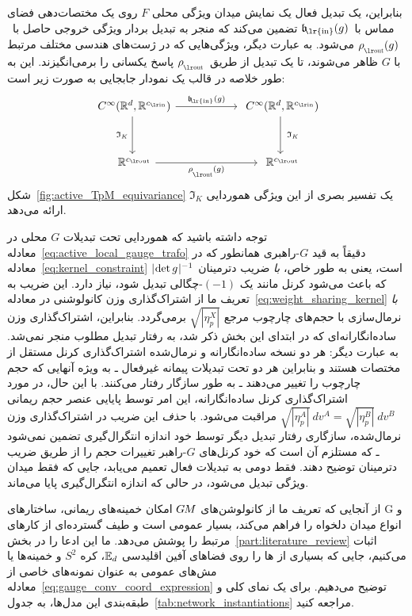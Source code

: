بنابراین، یک تبدیل فعال یک نمایش میدان ویژگی محلی $F$ روی یک مختصات‌دهی فضای مماس با~$\mathfrakb_{\mkern-5mu\textup{\lr{in}}}(g)$ تضمین می‌کند که منجر به تبدیل بردار ویژگی خروجی حاصل با~$\rhoout(g)$ می‌شود.
به عبارت دیگر، ویژگی‌هایی که در ژست‌های هندسی مختلف مرتبط با $G$ ظاهر می‌شوند، تا یک تبدیل از طریق~$\rhoout$ پاسخ یکسانی را برمی‌انگیزند.
این به طور خلاصه در قالب یک نمودار جابجایی به صورت زیر است:
\begin{equation}\label{cd:active_G_equivariance}
	\begin{tikzcd}[column sep=56pt, row sep=34pt, font=\normalsize]
		C^\infty(\R^d,\R^{\cin})
		\arrow[d, "\mathfrak{I}_K\,"']
		\arrow[r, "\mathfrakb_{\mkern-5mu\textup{\lr{in}}}(g)"]
		&
		C^\infty(\R^d,\R^{\cin})
		\arrow[d, "\ \mathfrak{I}_K"]
		\\
		\R^{\cout}
		\arrow[r, "\rhoout(g)"']
		&
		\R^{\cout}
	\end{tikzcd}
\end{equation}
شکل~\ref{fig:active_TpM_equivariance} یک تفسیر بصری از این ویژگی هموردایی $\mathfrak{I}_K$ ارائه می‌دهد.

توجه داشته باشید که هموردایی تحت تبدیلات $G$ محلی در معادله~\eqref{eq:active_local_gauge_trafo} دقیقاً به قید $G$-راهبری همانطور که در معادله~\eqref{eq:kernel_constraint} است، یعنی به طور خاص، \emph{با} ضریب دترمینان $|\mkern-2mu \det g \mkern1mu|^{-1}$ که باعث می‌شود کرنل مانند یک $(-1)$-چگالی تبدیل شود، نیاز دارد.
این ضریب به تعریف ما از اشتراک‌گذاری وزن کانولوشنی در معادله~\eqref{eq:weight_sharing_kernel} \emph{با} نرمال‌سازی با حجم‌های چارچوب مرجع $\sqrt{|\eta_p^X|}$ برمی‌گردد.
بنابراین، اشتراک‌گذاری وزن ساده‌انگارانه‌ای که در ابتدای این بخش ذکر شد، به رفتار تبدیل مطلوب منجر نمی‌شد.
به عبارت دیگر: هر دو نسخه ساده‌انگارانه و نرمال‌شده اشتراک‌گذاری کرنل مستقل از مختصات هستند و بنابراین هر دو تحت تبدیلات پیمانه غیرفعال ـ به ویژه آنهایی که حجم چارچوب را تغییر می‌دهند ـ به طور سازگار رفتار می‌کنند.
با این حال، در مورد اشتراک‌گذاری کرنل ساده‌انگارانه، این امر توسط پایایی عنصر حجم ریمانی $\sqrt{|\eta_p^A|}\ dv^A = \sqrt{|\eta_p^B|}\ dv^B$ مراقبت می‌شود.
با \emph{حذف} این ضریب در اشتراک‌گذاری وزن نرمال‌شده، سازگاری رفتار تبدیل دیگر توسط خود اندازه انتگرال‌گیری تضمین نمی‌شود ـ که مستلزم آن است که خود کرنل‌های $G$-راهبر تغییرات حجم را از طریق ضریب دترمینان توضیح دهند.
فقط دومی به تبدیلات فعال تعمیم می‌یابد، جایی که فقط میدان ویژگی تبدیل می‌شود، در حالی که اندازه انتگرال‌گیری پایا می‌ماند.

از آنجایی که تعریف ما از کانولوشن‌های $G\mkern-1.4muM$ امکان خمینه‌های ریمانی، ساختارهای G و انواع میدان دلخواه را فراهم می‌کند، بسیار عمومی است و طیف گسترده‌ای از کارهای مرتبط را پوشش می‌دهد.
ما این ادعا را در بخش~\ref{part:literature_review} اثبات می‌کنیم، جایی که بسیاری از \cnn{}ها را روی فضاهای آفین اقلیدسی $\mathbb{E}_d$، کره $S^2$ و خمینه‌ها یا مش‌های عمومی به عنوان نمونه‌های خاصی از معادله~\eqref{eq:gauge_conv_coord_expression} توضیح می‌دهیم.
برای یک نمای کلی و طبقه‌بندی این مدل‌ها، به جدول~\ref{tab:network_instantiations} مراجعه کنید.